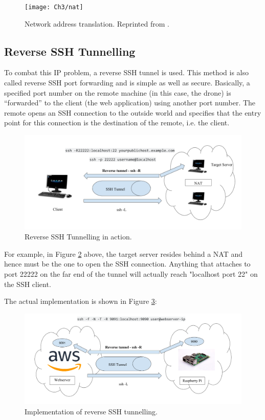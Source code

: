 \begin{figure}[t]
	\texttt{[image: Ch3/nat]}
	\caption{Network address translation. Reprinted from \protect{}.}
	\label{fig:nat}
\end{figure}
\FloatBarrier

\subsection{Reverse SSH Tunnelling}\label{subsect:ssh}
To combat this IP problem, a reverse SSH tunnel is used. This method is also called reverse SSH port forwarding and is simple as well as secure. Basically, a specified port number on the remote machine (in this case, the drone) is “forwarded” to the client (the web application) using another port number. The remote opens an SSH connection to the outside world and specifies that the entry point for this connection is the destination of the remote, i.e. the client.

\begin{figure}[t]
	\includegraphics[width=\textwidth]{figures/Ch3/Reverse_Basic.png}
	\caption{Reverse SSH Tunnelling in action.}
	\label{fig:reverse_ssh_basic}
\end{figure}
\FloatBarrier

For example, in Figure \ref{fig:reverse_ssh_basic} above, the target server resides behind a NAT and hence must be the one to open the SSH connection. Anything that attaches to port 22222 on the far end of the tunnel will actually reach "localhost port 22" on the SSH client.

The actual implementation is shown in Figure \ref{fig:reverse_ssh}:

\begin{figure}[t]
	\includegraphics[width=\textwidth]{figures/Ch3/Reverse_SSH.png}
	\caption{Implementation of reverse SSH tunnelling.}
	\label{fig:reverse_ssh}
\end{figure}
\FloatBarrier

